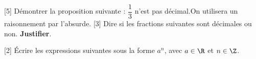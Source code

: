 \documentclass{exam}
\begin{document}
\begin{questions}
[5]
Démontrer la proposition suivante : \og $\dfrac{1}{3}$ n'est pas décimal.\fg On utilisera un raisonnement par l'absurde.
\vspace*{0.1cm}
\makeemptybox{8cm}
\vspace*{0.5cm}
[3]
Dire si les fractions suivantes sont décimales ou non. \textbf{Justifier}.
\vspace*{0.5cm}
[2]
Écrire les expressions suivantes sous la forme $a^n$, avec $a \in \R$ et $n \in \Z$.
\end{questions}
\end{document}
